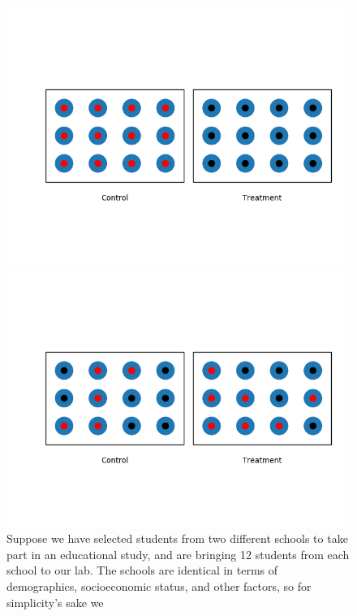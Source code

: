 \documentclass{tufte-handout}
\begin{document}
\begin{figure}[!ht]
  \centering
  \begin{minipage}{0.45\textwidth}
    \includegraphics[width=1.05\textwidth]{images/nonrandom}
  \end{minipage} %
  \begin{minipage}{0.45\textwidth}
    \includegraphics[width=1.05\textwidth]{images/random}
  \end{minipage} %
  \caption{Suppose we have selected students from two different schools to
  take part in an educational study, and are bringing 12 students from each
  school to our lab. The schools are identical in terms of demographics,
  socioeconomic status, and other factors, so for simplicity's sake we
}
\end{figure}
\end{document}
